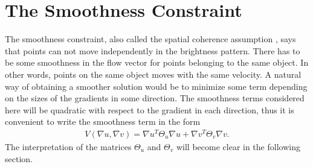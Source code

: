 \chapter{The Smoothness Constraint}
The smoothness constraint, also called the spatial coherence assumption \cite{Black199675}, says that points can not move independently in the brightness pattern. There has to be some smoothness in the flow vector for points belonging to the same object. In other words, points on the same object moves with the same velocity. A natural way of obtaining a smoother solution would be to minimize some term depending on the sizes of the gradients in some direction. The smoothness terms considered here will be quadratic with respect to the gradient in each direction, thus it is convenient to write the smoothness term in the form
\begin{align}
\label{SmoothnessTerm}
V(\nabla u, \nabla v) = \nabla u ^T \Theta_u \nabla u + \nabla v ^T \Theta_v \nabla v.
\end{align}
The interpretation of the matrices $\Theta_u$ and $\Theta_v$ will become clear in the following section. 